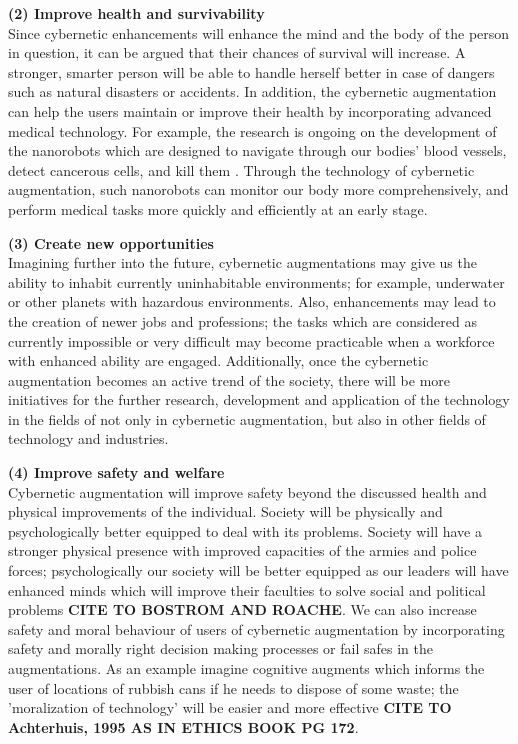 {\bf (2) Improve health and survivability} \\
Since cybernetic enhancements will enhance the mind and the body of the person in question, it can be argued that their chances of survival will increase. A stronger, smarter person will be able to handle herself better in case of dangers such as natural disasters or accidents. In addition, the cybernetic augmentation can help the users maintain or improve their health by incorporating advanced medical technology. For example, the research is ongoing on the development of the nanorobots which are designed to navigate through our bodies' blood vessels, detect cancerous cells, and kill them \cite{nanorobot}. Through the technology of cybernetic augmentation, such nanorobots can monitor our body more comprehensively, and perform medical tasks more quickly and efficiently at an early stage. 

{\bf (3) Create new opportunities}\\
Imagining further into the future, cybernetic augmentations may give us the ability to inhabit currently uninhabitable environments; for example, underwater or other planets with hazardous environments. Also, enhancements may lead to the creation of newer jobs and professions; the tasks which are considered as currently impossible or very difficult may become practicable when a workforce with enhanced ability are engaged. Additionally, once the cybernetic augmentation becomes an active trend of the society, there will be more initiatives for the further research, development and application of the technology in the fields of not only in cybernetic augmentation, but also in other fields of technology and industries.

{\bf (4) Improve safety and welfare}\\
Cybernetic augmentation will improve safety beyond the discussed health and physical improvements of the individual. Society will be physically and psychologically better equipped to deal with its problems. Society will have a stronger physical presence with improved capacities of the armies and police forces; psychologically our society will be better equipped as our leaders will have enhanced minds which will improve their faculties to solve social and political problems {\bf CITE TO BOSTROM AND ROACHE}. We can also increase safety and moral behaviour of users of cybernetic augmentation by incorporating safety and morally right decision making processes or fail safes in the augmentations. As an example imagine cognitive augments which informs the user of locations of rubbish cans if he needs to dispose of some waste; the 'moralization of technology' will be easier and more effective {\bf CITE TO Achterhuis, 1995 AS IN ETHICS BOOK PG 172}.

